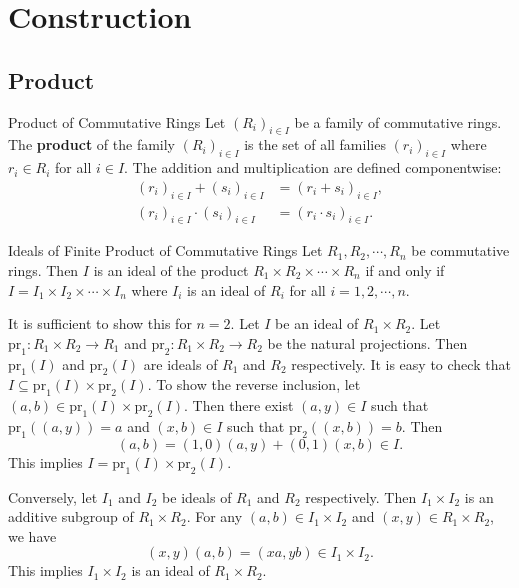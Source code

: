 \section{Construction}

\subsection{Product}
\begin{definition}{Product of Commutative Rings}{}
    Let $(R_i)_{i\in I}$ be a family of commutative rings. The \textbf{product} of the family $(R_i)_{i\in I}$ is the set of all families $(r_i)_{i\in I}$ where $r_i\in R_i$ for all $i\in I$. The addition and multiplication are defined componentwise:
    \begin{align*}
        (r_i)_{i\in I}+(s_i)_{i\in I}&=(r_i+s_i)_{i\in I},\\
        (r_i)_{i\in I}\cdot(s_i)_{i\in I}&=(r_i\cdot s_i)_{i\in I}.
    \end{align*}
\end{definition}



\begin{proposition}{Ideals of Finite Product of Commutative Rings}{}
    Let $R_1, R_2, \cdots, R_n$ be commutative rings. Then $I$ is an ideal of the product $R_1\times R_2\times \cdots \times R_n$ if and only if $I=I_1\times I_2\times \cdots \times I_n$ where $I_i$ is an ideal of $R_i$ for all $i=1,2,\cdots,n$.
\end{proposition}
\begin{prf}
    It is sufficient to show this for $n=2$. Let $I$ be an ideal of $R_1\times R_2$. Let $\mathrm{pr}_1:R_1\times R_2\to R_1$ and $\mathrm{pr}_2:R_1\times R_2\to R_2$ be the natural projections. Then $\mathrm{pr}_1(I)$ and $\mathrm{pr}_2(I)$ are ideals of $R_1$ and $R_2$ respectively. It is easy to check that $I\subseteq \mathrm{pr}_1(I)\times \mathrm{pr}_2(I)$. To show the reverse inclusion, let $(a,b)\in \mathrm{pr}_1(I)\times \mathrm{pr}_2(I)$. Then there exist $(a,y)\in I$ such that $\mathrm{pr}_1((a,y))=a$ and $(x,b)\in I$ such that $\mathrm{pr}_2((x,b))=b$. Then 
    \[
    (a,b)=(1,0)(a,y)+(0,1)(x,b)\in I.
    \]
    This implies $I=\mathrm{pr}_1(I)\times \mathrm{pr}_2(I)$.

    Conversely, let $I_1$ and $I_2$ be ideals of $R_1$ and $R_2$ respectively. Then $I_1\times I_2$ is an additive subgroup of $R_1\times R_2$. For any $(a,b)\in I_1\times I_2$ and $(x,y)\in R_1\times R_2$, we have
    \[
    (x,y)(a,b)=(xa,yb)\in I_1\times I_2.
    \]
    This implies $I_1\times I_2$ is an ideal of $R_1\times R_2$.
\end{prf}


